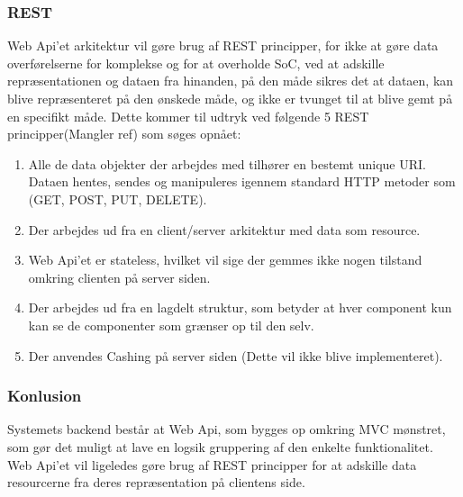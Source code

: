 \subsubsection{REST}
Web Api’et arkitektur vil gøre brug af REST principper, for ikke at gøre data overførelserne for komplekse og for at overholde SoC, ved at adskille repræsentationen og dataen fra hinanden, på den måde sikres det at dataen, kan blive repræsenteret på den ønskede måde, og ikke er tvunget til at blive gemt på en specifikt måde.
Dette kommer til udtryk ved følgende 5 REST principper(Mangler ref)  som søges opnået:
\begin{enumerate}
 \item Alle de data objekter der arbejdes med tilhører en bestemt unique URI. Dataen hentes, sendes og manipuleres igennem standard HTTP metoder som (GET, POST, PUT, DELETE).
 \item Der arbejdes ud fra en client/server arkitektur med data som resource. 
 \item Web Api’et er stateless, hvilket vil sige der gemmes ikke nogen tilstand omkring clienten på server siden.
 \item Der arbejdes ud fra en lagdelt struktur, som betyder at hver component kun kan se de componenter som grænser op til den selv.
 \item Der anvendes Cashing på server siden (Dette vil ikke blive implementeret).
\end{enumerate}

\subsubsection{Konlusion}

Systemets backend består at Web Api, som bygges op omkring MVC mønstret, som gør det muligt at lave en logsik gruppering af den enkelte funktionalitet. Web Api’et vil ligeledes gøre brug af REST principper for at adskille data resourcerne fra deres repræsentation på clientens side.

\newpage
